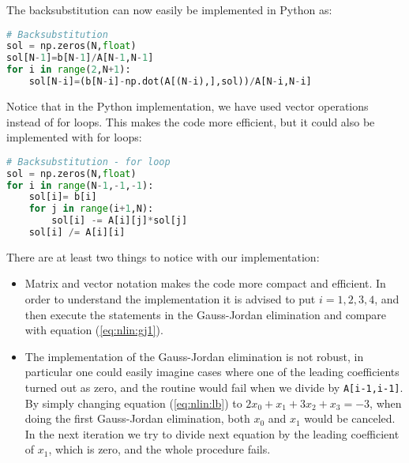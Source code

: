 \documentclass[graybox,sectrefs,envcountresetchap,open=right,final]{svmonodo}
\begin{document}
The backsubstitution can now easily be implemented in Python as:
\begin{lstlisting}[language=Python,style=blue1]
# Backsubstitution
sol = np.zeros(N,float)
sol[N-1]=b[N-1]/A[N-1,N-1]
for i in range(2,N+1):
    sol[N-i]=(b[N-i]-np.dot(A[(N-i),],sol))/A[N-i,N-i]
\end{lstlisting}
Notice that in the Python implementation, we have used vector operations instead of for loops. This makes the code more efficient, but it could also be implemented with for loops: 
\begin{lstlisting}[language=Python,style=blue1]
# Backsubstitution - for loop
sol = np.zeros(N,float)
for i in range(N-1,-1,-1):
    sol[i]= b[i]
    for j in range(i+1,N):
        sol[i] -= A[i][j]*sol[j]
    sol[i] /= A[i][i]
\end{lstlisting}
There are at least two things to notice with our implementation:
\begin{itemize}
\item Matrix and vector notation makes the code more compact and efficient. In order to understand the implementation it is advised to put $i=1, 2, 3, 4$, and then execute the statements in the Gauss-Jordan elimination and compare with equation (\ref{eq:nlin:gj1}).

\item The implementation of the Gauss-Jordan elimination is not robust, in particular one could easily imagine cases where one of the leading coefficients turned out as zero, and the routine would fail when we divide by \texttt{A[i-1,i-1]}. By simply changing equation (\ref{eq:nlin:lb}) to $2x_0+x_1+3x_2+x_3=-3$, when doing the first Gauss-Jordan elimination, both $x_0$ and $x_1$ would be canceled. In the next iteration we try to divide next equation by the leading coefficient of $x_1$, which is zero, and the whole procedure fails.
\end{itemize}

\noindent
\end{document}
